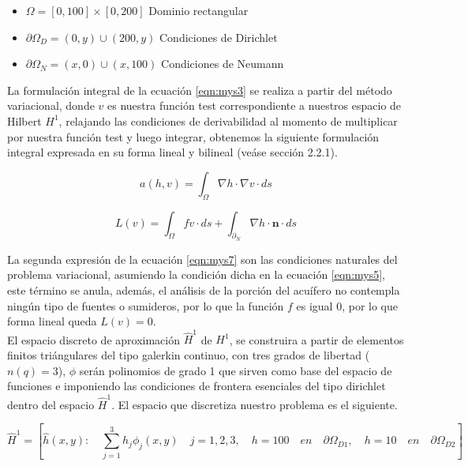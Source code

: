 \begin{itemize}
\item  $\Omega=[0,100]{\times}[0,200]$ Dominio rectangular
\item  ${\partial}\Omega_{D}={(0,y){\cup}(200,y)}$ Condiciones de Dirichlet
\item  ${\partial}\Omega_{N}={(x,0){\cup}(x,100)}$ Condiciones de Neumann
\end{itemize}

La formulación integral de la ecuación \ref{eqn:mys3} se realiza a partir del método variacional, donde $v$ es nuestra función test correspondiente a nuestros espacio de Hilbert $H^{1}$, relajando las condiciones de derivabilidad al momento de multiplicar por nuestra función test y luego integrar, obtenemos la siguiente formulación integral expresada en su forma lineal y bilineal (veáse sección 2.2.1).

\begin{equation}
 \label{eqn:mys6}
 a(h,v)=\int_{\Omega}^{} {\nabla}h{\cdot}{\nabla}v \cdot ds
\end{equation}  

\begin{equation}
 \label{eqn:mys7}
 L(v)= \int_{\Omega}^{} fv \cdot ds + \int_{{\partial}_{N}}^{} {\nabla}h{\cdot}\textbf{n} \cdot ds
\end{equation}  

La segunda expresión de la ecuación \ref{eqn:mys7} son las condiciones naturales del problema variacional, asumiendo la condición dicha en la ecuación \ref{eqn:mys5}, este término se anula, además, el análisis de la porción del acuífero no contempla ningún tipo de fuentes o sumideros, por lo que la función $f$ es igual $0$, por lo que forma lineal queda $L(v)=0$.
\\

El espacio discreto de aproximación $\hat{H}^{1}$ de $H^{1}$, se construira a partir de elementos finitos triángulares del tipo galerkin continuo, con tres grados de libertad ($n(q)=3$), $\phi$ serán polinomios de grado 1 que sirven como base del espacio de funciones e imponiendo las condiciones de frontera esenciales del tipo dirichlet dentro del espacio $\hat{H}^{1}$. El espacio que discretiza nuestro problema es el siguiente.

\begin{equation}
\label{eqn:mys8}
\hat{H}^{1}=  \left[ \hat{h}(x,y) : \quad \displaystyle\sum_{j=1}^3  h_{j}\phi_{j}(x,y)  \quad  j=1,2,3, \quad h=100 \quad en  \quad {\partial}\Omega_{D1}, \quad h=10 \quad en \quad {\partial}\Omega_{D2} \right]     
\end{equation}  

